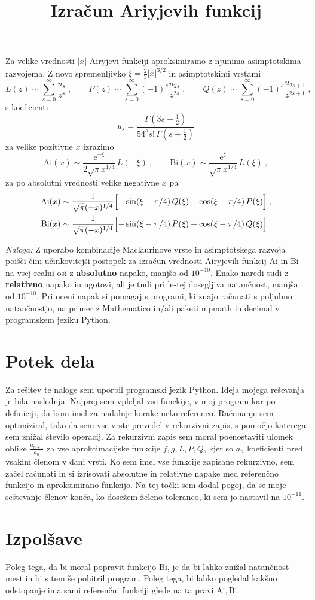 \documentclass{article}
\newcommand{\Ai}{\mathrm{Ai}}
\newcommand{\Bi}{\mathrm{Bi}}
\theoremstyle{definition}
\theoremstyle{plain}
\numberwithin{definition}{section}
\numberwithin{theorem}{section} \title{Izračun Ariyjevih funkcij}
\begin{document}
Za velike vrednosti $|x|$ Airyjevi funkciji aproksimiramo
z njunima asimp\-tot\-ski\-ma razvojema.  Z novo spremenljivko
$\xi=\frac{2}{3} |x|^{3/2}$ in asimptotskimi vrstami
%
\begin{equation*}
  L(z) \sim \sum_{s=0}^\infty \frac{u_s}{z^s}\>,\qquad
  P(z) \sim \sum_{s=0}^\infty (-1)^s \frac{u_{2s}}{z^{2 s}}\>,\qquad
  Q(z) \sim \sum_{s=0}^\infty (-1)^s \frac{u_{2s+1}}{z^{2 s+1}}\>,
\end{equation*}
s koeficienti
\begin{equation*}
u_s = \frac{ \Gamma(3s + \frac{1}{2})}
        {54^s s!\, \Gamma(s + \frac{1}{2}) }
\end{equation*}
za velike pozitivne $x$ izrazimo
%
\begin{equation*}
\Ai(x)\sim  \frac{\mathrm{e}^{-\xi}}{2\sqrt{\pi} x^{1/4}} \, L(-\xi) \>, \qquad
\Bi(x)\sim  \frac{\mathrm{e}^{\xi}} { \sqrt{\pi} x^{1/4}} \, L(\xi)\>,
\end{equation*}
%
za po absolutni vrednosti velike negativne $x$ pa
%
%
\begin{align*}
    \Ai(x)&\sim  \frac{1}{\sqrt{\pi} (-x)^{1/4}}
    \Bigl[ \phantom{-}\sin(\xi-\pi/4) \, Q(\xi)
                    + \cos(\xi-\pi/4) \, P(\xi)\Bigr] \>, \\
    \Bi(x)&\sim  \frac{1}{\sqrt{\pi} (-x)^{1/4}}
    \Bigl[ - \sin(\xi-\pi/4) \, P(\xi)
      + \cos(\xi-\pi/4) \, Q(\xi)\Bigr]\>.
\end{align*}

\bigskip

{\sl Naloga:} Z uporabo kombinacije Maclaurinove vrste in asimptotskega
razvoja poišči čim učinkovitejši postopek za izračun
vrednosti Airyjevih funkcij $\Ai$ in $\Bi$ na vsej real\-ni osi
z {\bf absolutno} napako, manjšo od $10^{-10}$. Enako naredi tudi z {\bf relativno} napako in ugotovi,
ali je tudi pri le-tej dosegljiva natančnost, manjša od $10^{-10}$.
Pri oceni napak si po\-ma\-gaj s programi, ki znajo računati s poljubno
natančnostjo, na primer z {\sc Mathematico} in/ali paketi {\sc mpmath} in {\sc decimal} v programskem
jeziku {\sc Python}.

\section{Potek dela}
Za rešitev te naloge sem uporbil programski jezik Python. 
Ideja mojega reševanja je bila naslednja. Najprej sem vpleljal vse funckije, 
v moj program kar po definiciji, 
da bom imel za nadalnje korake neko referenco. Računanje sem optimiziral,
tako da sem vse vrste prevedel v rekurzivni zapis, s pomočjo katerega sem
znižal število operacij. Za rekurzivni zapis sem moral poenostaviti
ulomek oblike $\frac{a_{n+1}}{a_n}$ za vse aprokcimacijske funkcije 
$f, g, L, P, Q$, kjer so $a_n$ koeficienti pred vsakim členom v dani vrsti.
Ko sem imel vse funkcije zapisane rekurzivno, sem začel računati 
in si izrisovati absolutne in relativne napake med referenčno funkcijo in 
aproksimirano funkcijo. Na tej točki sem dodal pogoj, da se moje seštevanje
členov konča, ko dosežem želeno toleranco, ki sem jo nastavil na $10^{-11}$.

\section{Izpolšave}
Poleg tega, da bi moral popravit funkcijo $\Bi$, je da bi lahko znižal 
natančnost mest in bi s tem še pohitril program. Poleg tega, bi lahko pogledal
kakšno odstopanje ima sami referenčni funkciji glede na ta pravi $\Ai, \Bi$.
\end{document}
